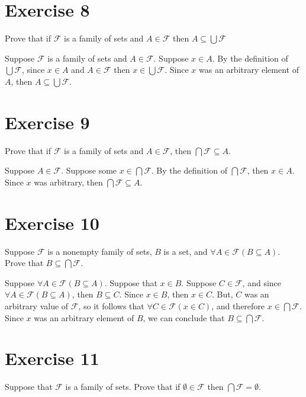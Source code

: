 \documentclass[11pt]{article}
\newcommand{\family}[1]{\mathcal{#1}}
\begin{document}
\section*{Exercise 8}

Prove that if $\family{F}$ is a family of sets and $A \in \family{F}$ then 
$A \subseteq \bigcup \family{F}$

Suppose $\family{F}$ is a family of sets and $A \in \family{F}$. Suppose 
$x \in A$. By the definition of $\bigcup \family{F}$, since $x \in A$ and 
$A \in \family{F}$ then $x \in \bigcup \family{F}$. Since $x$ was an 
arbitrary element of $A$, then $A \subseteq \bigcup \family{F}$.

\section*{Exercise 9}

Prove that if $\family{F}$ is a family of sets and $A \in \family{F}$, then 
$\bigcap \family{F} \subseteq A$.

Suppose $A \in \family{F}$. Suppose some $x \in \bigcap \family{F}$. By the 
definition of $\bigcap \family{F}$, then $x \in A$. Since $x$ was arbitrary,
then $\bigcap \family{F} \subseteq A$.

\section*{Exercise 10}

Suppose $\family{F}$ is a nonempty family of sets, $B$ is a set, and 
$\forall A \in \family{F} (B \subseteq A)$. Prove that 
$B \subseteq \bigcap \family{F}$.

Suppose $\forall A \in \family{F} (B \subseteq A)$. Suppose that $x \in B$. 
Suppose $C \in \family{F}$, and since $\forall A \in \family{F} (B \subseteq A)$,
then $B \subseteq C$. Since $x \in B$, then $x \in C$. But, $C$ was an arbitrary 
value of $\family{F}$, so it follows that $\forall C \in \family{F} (x \in C)$, 
and therefore $x \in \bigcap \family{F}$. Since $x$ was an arbitrary element of 
$B$, we can conclude that $B \subseteq \bigcap \family{F}$.

\section*{Exercise 11}

Suppose that $\family{F}$ is a family of sets. Prove that if 
$\emptyset \in \family{F}$ then $\bigcap \family{F} = \emptyset$.
\end{document}
